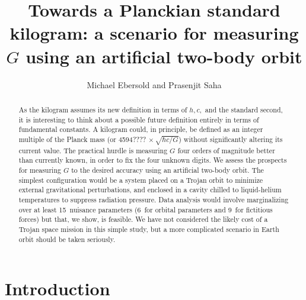 \documentclass[]{rsos}
\begin{document}
\title{Towards a Planckian standard kilogram:
a scenario for measuring $G$ using an artificial two-body orbit}

\author{Michael Ebersold and Prasenjit Saha}

\address{Physik-Institut, University of Zurich, Winterthurerstrasse
  190, 8057 Zurich, Switzerland}

\subject{xxxxx, xxxxx, xxxx}




\begin{abstract}
As the kilogram assumes its new definition in terms of $h,c,$ and the
standard second, it is interesting to think about a possible future
definition entirely in terms of fundamental constants.  A kilogram
could, in principle, be defined as an integer multiple of the Planck
mass (or 4594????$\,\times\sqrt{\hbar c/G}$) without significantly
altering its current value.  The practical hurdle is measuring $G$
four orders of magnitude better than currently known, in order to fix
the four unknown digits.  We assess the prospects for measuring $G$ to
the desired accuracy using an artificial two-body orbit.  The simplest
configuration would be a system placed on a Trojan orbit to minimize
external gravitational perturbations, and enclosed in a cavity chilled
to liquid-helium temperatures to suppress radiation pressure.  Data
analysis would involve marginalizing over at least 15~nuisance
parameters (6~for orbital parameters and 9~for fictitious forces) but
that, we show, is feasible.  We have not considered the likely cost of
a Trojan space mission in this simple study, but a more complicated
scenario in Earth orbit should be taken seriously.
\end{abstract}

\maketitle

\section{Introduction}
\end{document}
